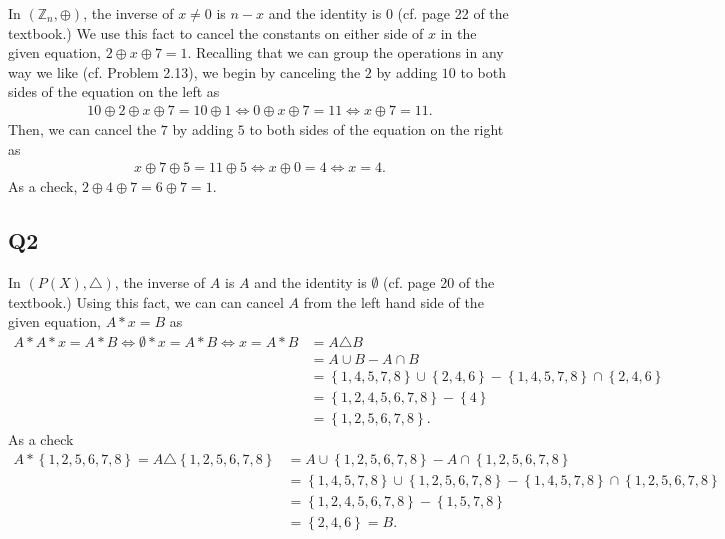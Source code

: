 \documentclass[12pt]{article}
\def\Z{{\mathbb Z}}        %
\numberwithin{theorem}{section}
\numberwithin{equation}{section}
\numberwithin{remark}{section}
\numberwithin{definition}{section}
\numberwithin{theorem}{section}
\numberwithin{lemma}{section}
\numberwithin{example}{section}
\begin{document}
In $(\Z_n,\oplus)$, the inverse of $x\neq0$ is $n-x$ and the identity is $0$ (cf. page 22 of the textbook.) We use this fact to cancel the constants on either side of $x$ in the given equation, $2 \oplus x \oplus 7 = 1$. Recalling that we can group the operations in any way we like (cf. Problem 2.13), we begin by canceling the $2$ by adding $10$ to both sides of the equation on the left as
\begin{align*}
	10 \oplus 2 \oplus x \oplus 7 = 10 \oplus 1 \iff 0 \oplus x \oplus 7 = 11 \iff x \oplus 7 = 11.
\end{align*}
Then, we can cancel the $7$ by adding $5$ to both sides of the equation on the right as 
\begin{align*}
	x \oplus 7 \oplus 5 = 11 \oplus 5 \iff x \oplus 0 = 4 \iff x = 4.
\end{align*}
As a check, $2 \oplus 4 \oplus 7 = 6 \oplus 7 = 1$. 



\subsection{Q2}

In $\left(P(X),\triangle\right)$, the inverse of $A$ is $A$ and the identity is $\emptyset$ (cf. page 20 of the textbook.) Using this fact, we can can cancel $A$ from the left hand side of the given equation, $A*x=B$ as
\begin{align*}
	A*A*x=A*B\iff\emptyset * x= A*B\iff x = A*B & = A \triangle B \\
	& = A \cup B - A \cap B \\
	& = \left\{1,4,5,7,8\right\}\cup\left\{2,4,6\right\} - \left\{1,4,5,7,8\right\}\cap\left\{2,4,6\right\} \\
	& = \left\{1,2,4,5,6,7,8\right\}- \left\{4\right\}\\
	& = \left\{1,2,5,6,7,8\right\}.
\end{align*}
As a check 
\begin{align*}
	A*\left\{1,2,5,6,7,8\right\} = A\triangle\left\{1,2,5,6,7,8\right\}  & = A\cup\left\{1,2,5,6,7,8\right\} - A\cap\left\{1,2,5,6,7,8\right\}\\
	& = \left\{1,4,5,7,8\right\}\cup\left\{1,2,5,6,7,8\right\} - \left\{1,4,5,7,8\right\}\cap\left\{1,2,5,6,7,8\right\}\\
	& = \left\{1,2,4,5,6,7,8\right\} - \left\{1,5,7,8\right\}\\
	& = \left\{2,4,6\right\} = B.\\
\end{align*}
\end{document}
